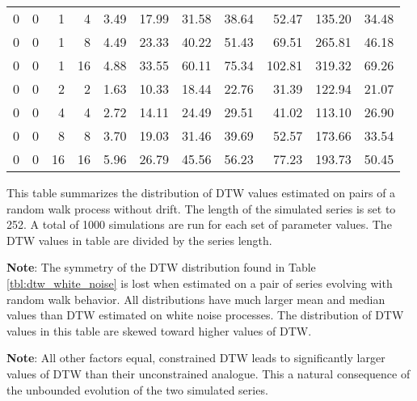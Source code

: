 \begin{table}[!ht]
\begin{threeparttable}
\begin{tabular}{r r r r | r r r r r r r}
            0 & 0 & 1  & 4  & 3.49 & 17.99 & 31.58 & 38.64 &  52.47 & 135.20 & 34.48  \\
            0 & 0 & 1  & 8  & 4.49 & 23.33 & 40.22 & 51.43 &  69.51 & 265.81 & 46.18  \\
            0 & 0 & 1  & 16 & 4.88 & 33.55 & 60.11 & 75.34 & 102.81 & 319.32 & 69.26  \\
            \midrule
            0 & 0 & 2  & 2  & 1.63 & 10.33 & 18.44 & 22.76 &  31.39 & 122.94 & 21.07  \\
            0 & 0 & 4  & 4  & 2.72 & 14.11 & 24.49 & 29.51 &  41.02 & 113.10 & 26.90  \\
            0 & 0 & 8  & 8  & 3.70 & 19.03 & 31.46 & 39.69 &  52.57 & 173.66 & 33.54  \\
            0 & 0 & 16 & 16 & 5.96 & 26.79 & 45.56 & 56.23 &  77.23 & 193.73 & 50.45  \\
            \hline
        \end{tabular}
        \begin{tablenotes}
            \item{This table summarizes the distribution of DTW values estimated on pairs of a random walk process without drift. The length of the simulated series is set to 252. A total of 1000 simulations are run for each set of parameter values. The DTW values in table are divided by the series length.}
            \item{\textbf{Note}: The symmetry of the DTW distribution found in Table \ref{tbl:dtw_white_noise} is lost when estimated on a pair of series evolving with random walk behavior. All distributions have much larger mean and median values than DTW estimated on white noise processes. The distribution of DTW values in this table are skewed toward higher values of DTW.}
            \item{\textbf{Note}: All other factors equal, constrained DTW leads to significantly larger values of DTW than their unconstrained analogue. This a natural consequence of the unbounded evolution of the two simulated series.}
        \end{tablenotes}
    \end{threeparttable}
\end{table}


